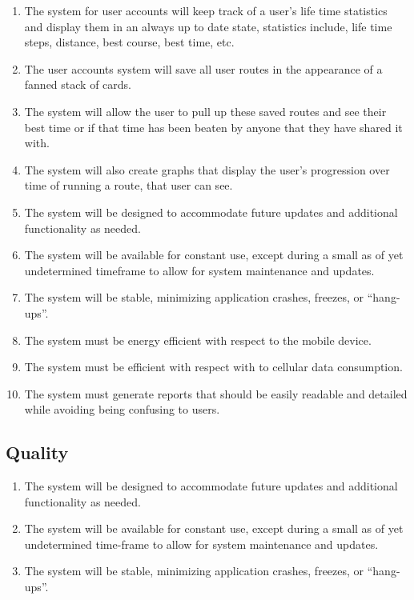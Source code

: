 \documentclass{article}
\begin{document}
\begin{enumerate}
    \item The system for user accounts will keep track of a user's life time statistics and display them in an always up to date state, statistics include, life time steps, distance, best course, best time, etc.
    \item The user accounts system will save all user routes in the appearance of a fanned stack of cards.
    \item The system will allow the user to pull up these saved routes and see their best time or if that time has been beaten by anyone that they have shared it with.
    \item The system will also create graphs that display the user’s progression over time of running a route, that user can see.
    \item The system will be designed to accommodate future updates and additional functionality as needed.
    \item The system will be available for constant use, except during a small as of yet undetermined timeframe to allow for system maintenance and updates.
    \item The system will be stable, minimizing application crashes, freezes, or “hang-ups”.
    \item The system must be energy efficient with respect to the mobile device.
    \item The system must be efficient with respect with to cellular data consumption.
    \item The system must generate reports that should be easily readable and detailed while avoiding being confusing to users.




\end{enumerate}
\subsection{Quality}
\begin{enumerate}
    \item The system will be designed to accommodate future updates and additional functionality as needed.
    \item The system will be available for constant use, except during a small as of yet undetermined time-frame to allow for system maintenance and updates.
    \item The system will be stable, minimizing application crashes, freezes, or “hang-ups”.
\end{enumerate}
\end{document}
